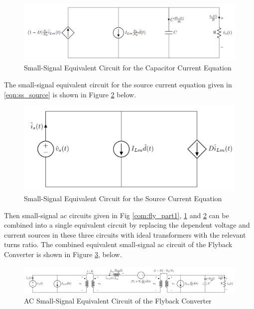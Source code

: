 \begin{figure}[H]
\begin{center}
\includegraphics[width=1\textwidth]{Compensator/flyback_part2.png}
\caption{Small-Signal Equivalent Circuit for the Capacitor Current Equation}
\label{com:fly_part2}
\end{center}
\end{figure}

The small-signal equivalent circuit for the source current equation given in \eqref{eqn:ss_source} is shown in Figure \ref{com:fly_part3} below.

\begin{figure}[H]
\begin{center}
\includegraphics[width=1\textwidth]{Compensator/flyback_part3.png}
\caption{Small-Signal Equivalent Circuit for the Source Current Equation}
\label{com:fly_part3}
\end{center}
\end{figure}

Then small-signal ac circuits given in Fig \ref{com:fly_part1}, \ref{com:fly_part2} and \ref{com:fly_part3} can be combined into a single equivalent circuit by replacing the dependent voltage and current sources in these three circuits with ideal transformers with the relevant turns ratio. The combined equivalent small-signal ac circuit of the Flyback Converter is shown in Figure \ref{com:fly_combined}, below.

\begin{figure}[H]
\begin{center}
\includegraphics[width=1\textwidth]{Compensator/flyback_combined.png}
\caption{AC Small-Signal Equivalent Circuit of the Flyback Converter}
\label{com:fly_combined}
\end{center}
\end{figure}

